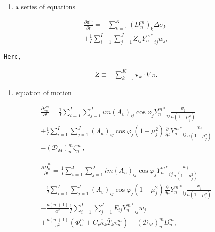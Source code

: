 \begin{enumerate}
\def\labelenumi{\arabic{enumi}.}
\tightlist
\item
  a series of equations
\end{enumerate}

\begin{eqnarray}
  \frac{\partial \pi_m^m}{\partial t}
  =  - \sum_{k=1}^{K} (D_n^m)_k \Delta  \sigma_k  \\
     + \frac{1}{I} \sum_{i=1}^{I} \sum_{j=1}^{J}  
               Z_{ij} {Y_n^{m *}}_{ij} w_j  ,
\end{eqnarray}

\begin{verbatim}
Here,
\end{verbatim}

\begin{eqnarray}
Z \equiv - \sum_{k=1}^{K} \mathbf{v}_k \cdot \nabla \pi .
\end{eqnarray}

\begin{enumerate}
\def\labelenumi{\arabic{enumi}.}
\setcounter{enumi}{1}
\tightlist
\item
  equation of motion
\end{enumerate}

\begin{eqnarray}
  \frac{\partial \zeta_n^m}{\partial t} 
   =  \frac{1}{I} \sum_{i=1}^{I} \sum_{j=1}^{J}  
          im (A_v)_{ij} \cos\varphi_j
          {Y_n^{m *}}_{ij}
         \frac{w_j}{a(1-\mu_j^{2})} 
          \\
   +    \frac{1}{I} \sum_{i=1}^{I} \sum_{j=1}^{J}  
          (A_u)_{ij} \cos\varphi_j
          (1-\mu_j^2) 
          \frac{\partial }{\partial \mu} {Y_n^{m *}}_{ij}
          \frac{w_j}{a(1-\mu_j^{2})} 
          \\ 
   -   ({\mathcal D}_M)_n^m \zeta_n^m  \; ,
\end{eqnarray}

\begin{eqnarray}
  \frac{\partial \tilde{D}_n^m}{\partial t} 
   =  \frac{1}{I} \sum_{i=1}^{I} \sum_{j=1}^{J}  
          im (A_u)_{ij} \cos\varphi_j
          {Y_n^{m *}}_{ij}
         \frac{w_j}{a(1-\mu_j^{2})} 
          \\
   -    \frac{1}{I} \sum_{i=1}^{I} \sum_{j=1}^{J}  
          (A_v)_{ij} \cos\varphi_j
          (1-\mu_j^2) 
          \frac{\partial }{\partial \mu} {Y_n^{m *}}_{ij}
          \frac{w_j}{a(1-\mu_j^{2})} 
          \\
   -   \frac{n(n+1)}{a^{2}} 
         \frac{1}{I} \sum_{i=1}^{I} \sum_{j=1}^{J}  
          E_{ij} {Y_n^{m *}}_{ij} w_j
          \\ 
   +   \frac{n(n+1)}{a^{2}} 
          ( \Phi_n^m + C_{p} \hat{\kappa}_k \bar{T}_k \pi_n^m ) 
          -  ({\mathcal D}_M)_n^m D_n^m  ,
\end{eqnarray}

